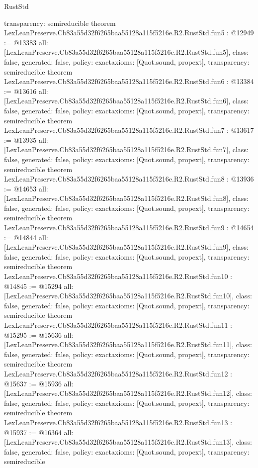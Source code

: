 \begin{lexlean}{RustStd}
\begin{coremodule}
{  transparency: semireducible
}
theorem LexLeanPreserve.Cb83a55d32f6265baa55128a115f5216e.R2.RustStd.fun5 : @12949 := @13383 {
  all: [LexLeanPreserve.Cb83a55d32f6265baa55128a115f5216e.R2.RustStd.fun5],
  class: false,
  generated: false,
  policy: exact{axioms: [Quot.sound, propext]},
  transparency: semireducible
}
theorem LexLeanPreserve.Cb83a55d32f6265baa55128a115f5216e.R2.RustStd.fun6 : @13384 := @13616 {
  all: [LexLeanPreserve.Cb83a55d32f6265baa55128a115f5216e.R2.RustStd.fun6],
  class: false,
  generated: false,
  policy: exact{axioms: [Quot.sound, propext]},
  transparency: semireducible
}
theorem LexLeanPreserve.Cb83a55d32f6265baa55128a115f5216e.R2.RustStd.fun7 : @13617 := @13935 {
  all: [LexLeanPreserve.Cb83a55d32f6265baa55128a115f5216e.R2.RustStd.fun7],
  class: false,
  generated: false,
  policy: exact{axioms: [Quot.sound, propext]},
  transparency: semireducible
}
theorem LexLeanPreserve.Cb83a55d32f6265baa55128a115f5216e.R2.RustStd.fun8 : @13936 := @14653 {
  all: [LexLeanPreserve.Cb83a55d32f6265baa55128a115f5216e.R2.RustStd.fun8],
  class: false,
  generated: false,
  policy: exact{axioms: [Quot.sound, propext]},
  transparency: semireducible
}
theorem LexLeanPreserve.Cb83a55d32f6265baa55128a115f5216e.R2.RustStd.fun9 : @14654 := @14844 {
  all: [LexLeanPreserve.Cb83a55d32f6265baa55128a115f5216e.R2.RustStd.fun9],
  class: false,
  generated: false,
  policy: exact{axioms: [Quot.sound, propext]},
  transparency: semireducible
}
theorem LexLeanPreserve.Cb83a55d32f6265baa55128a115f5216e.R2.RustStd.fun10 : @14845 := @15294 {
  all: [LexLeanPreserve.Cb83a55d32f6265baa55128a115f5216e.R2.RustStd.fun10],
  class: false,
  generated: false,
  policy: exact{axioms: [Quot.sound, propext]},
  transparency: semireducible
}
theorem LexLeanPreserve.Cb83a55d32f6265baa55128a115f5216e.R2.RustStd.fun11 : @15295 := @15636 {
  all: [LexLeanPreserve.Cb83a55d32f6265baa55128a115f5216e.R2.RustStd.fun11],
  class: false,
  generated: false,
  policy: exact{axioms: [Quot.sound, propext]},
  transparency: semireducible
}
theorem LexLeanPreserve.Cb83a55d32f6265baa55128a115f5216e.R2.RustStd.fun12 : @15637 := @15936 {
  all: [LexLeanPreserve.Cb83a55d32f6265baa55128a115f5216e.R2.RustStd.fun12],
  class: false,
  generated: false,
  policy: exact{axioms: [Quot.sound, propext]},
  transparency: semireducible
}
theorem LexLeanPreserve.Cb83a55d32f6265baa55128a115f5216e.R2.RustStd.fun13 : @15937 := @16364 {
  all: [LexLeanPreserve.Cb83a55d32f6265baa55128a115f5216e.R2.RustStd.fun13],
  class: false,
  generated: false,
  policy: exact{axioms: [Quot.sound, propext]},
  transparency: semireducible
}
\end{coremodule}
\end{lexlean}

